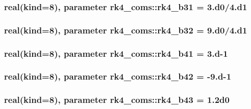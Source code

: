\subsubsection[{\texorpdfstring{rk4\+\_\+b31}{rk4_b31}}]{\setlength{\rightskip}{0pt plus 5cm}real(kind=8), parameter rk4\+\_\+coms\+::rk4\+\_\+b31 = 3.d0/4.d1}\hypertarget{namespacerk4__coms_a25fefbdc031aa0c923082df76e233542}{}\label{namespacerk4__coms_a25fefbdc031aa0c923082df76e233542}
\subsubsection[{\texorpdfstring{rk4\+\_\+b32}{rk4_b32}}]{\setlength{\rightskip}{0pt plus 5cm}real(kind=8), parameter rk4\+\_\+coms\+::rk4\+\_\+b32 = 9.d0/4.d1}\hypertarget{namespacerk4__coms_aeadece49a8e779db69ab3c866d710851}{}\label{namespacerk4__coms_aeadece49a8e779db69ab3c866d710851}
\subsubsection[{\texorpdfstring{rk4\+\_\+b41}{rk4_b41}}]{\setlength{\rightskip}{0pt plus 5cm}real(kind=8), parameter rk4\+\_\+coms\+::rk4\+\_\+b41 = 3.d-\/1}\hypertarget{namespacerk4__coms_a027909c6e9575ba7ea384f530f1fea8c}{}\label{namespacerk4__coms_a027909c6e9575ba7ea384f530f1fea8c}
\subsubsection[{\texorpdfstring{rk4\+\_\+b42}{rk4_b42}}]{\setlength{\rightskip}{0pt plus 5cm}real(kind=8), parameter rk4\+\_\+coms\+::rk4\+\_\+b42 = -\/9.d-\/1}\hypertarget{namespacerk4__coms_a8e97d0778db0718264f454af0d04e0da}{}\label{namespacerk4__coms_a8e97d0778db0718264f454af0d04e0da}
\subsubsection[{\texorpdfstring{rk4\+\_\+b43}{rk4_b43}}]{\setlength{\rightskip}{0pt plus 5cm}real(kind=8), parameter rk4\+\_\+coms\+::rk4\+\_\+b43 = 1.\+2d0}\hypertarget{namespacerk4__coms_a5c0f66631b902af266e04130bea41001}{}\label{namespacerk4__coms_a5c0f66631b902af266e04130bea41001}
